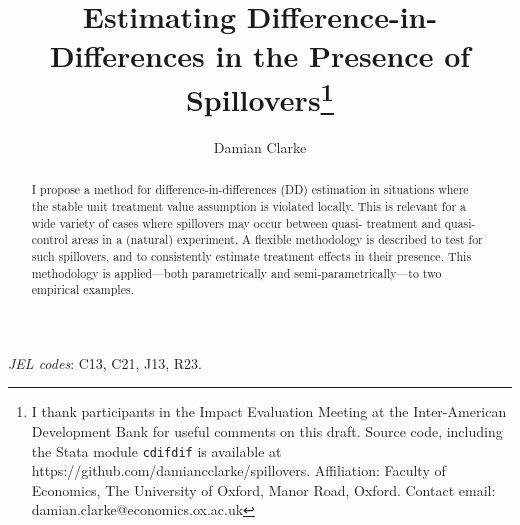 \documentclass{article}
\title{Estimating Difference-in-Differences in the Presence of Spillovers\footnote{
I thank participants in the Impact Evaluation Meeting at the Inter-American 
Development Bank for useful comments on this draft. Source code, including the
Stata module \texttt{cdifdif} is available at 
https://github.com/damiancclarke/spillovers.  Affiliation: Faculty of Economics, 
The University of Oxford, Manor Road, Oxford. Contact email: 
damian.clarke@economics.ox.ac.uk}}
\author{Damian Clarke}
\begin{document}
\maketitle

\begin{abstract}
I propose a method for difference-in-differences (DD) estimation in situations 
where the stable unit treatment value assumption is violated locally. This is
relevant for a wide variety of cases where spillovers may occur between quasi-%
treatment and quasi-control areas in a (natural) experiment. A flexible 
methodology is described to test for such spillovers, and to consistently 
estimate treatment effects in their presence. This methodology is applied---both 
parametrically and semi-parametrically---to two empirical examples.
\end{abstract}
\hspace{8mm} \emph{JEL codes}: C13, C21, J13, R23. \\
\end{document}
